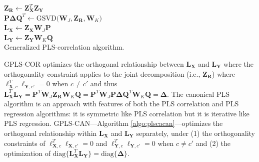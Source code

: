 \documentclass[12pt]{article}
\begin{document}
\begin{algorithm}
\DontPrintSemicolon
\SetAlgoLined
{}
\BlankLine
  $\mathbf{Z}_{\mathbf{R}} \leftarrow {\mathbf Z}_{{\mathbf X}}^{T}{\mathbf Z}_{{\mathbf Y}}$ \\
  $\mathbf{P}\boldsymbol{\Delta}{\mathbf Q}^{T} \leftarrow \mathrm{GSVD(} {\mathbf W}_{J}, \mathbf{Z}_{\mathbf{R}}, {\mathbf W}_{K} \mathrm{)}$ \\
  ${\mathbf L}_{\mathbf X} \leftarrow {\mathbf Z}_{\mathbf X}{\mathbf W}_{J}{\mathbf P}$ \\
  ${\mathbf L}_{\mathbf Y} \leftarrow {\mathbf Z}_{\mathbf Y}{\mathbf W}_{K}{\mathbf Q}$ \\
  
\caption{Generalized PLS-correlation algorithm.}
\label{algo:plsc}
\end{algorithm}

GPLS-COR optimizes the orthogonal relationship between
\({\mathbf L}_{\mathbf X}\) and \({\mathbf L}_{\mathbf Y}\) where the
orthogonality constraint applies to the joint decomposition (i.e.,
\(\mathbf{Z}_{\mathbf{R}}\)) where
\({\boldsymbol \ell}_{{\mathbf X},c}^{T}{\boldsymbol \ell}_{{\mathbf Y},c'} = 0\)
when \(c \neq c'\) and thus
\({\mathbf L}_{\mathbf X}^{T}{\mathbf L}_{\mathbf Y} = {\mathbf P}^{T}{\mathbf W}_{J}{\mathbf Z}_{{\mathbf R}}{\mathbf W}_{K}{\mathbf Q} = {\mathbf P}^{T}{\mathbf W}_{J}{\mathbf P}{\mathbf \Delta}{\mathbf Q}^{T}{\mathbf W}_{K}{\mathbf Q} = {\boldsymbol \Delta}\).
The canonical PLS algorithm is an approach with features of both the PLS
correlation and PLS regression algorithms: it is symmetric like PLS
correlation but it is iterative like PLS regression.
GPLS-CAN---Algorithm \ref{algo:plscacan}---optimizes the orthogonal
relationship within \({\mathbf L}_{\mathbf X}\) and
\({\mathbf L}_{\mathbf Y}\) separately, under (1) the orthogonality
constraints of
\({\boldsymbol \ell}_{{\mathbf X},c}^{T}{\boldsymbol \ell}_{{\mathbf X},c'} = 0\)
and
\({\boldsymbol \ell}_{{\mathbf Y},c}^{T}{\boldsymbol \ell}_{{\mathbf Y},c'} = 0\)
when \(c \neq c'\) and (2) the optimization of
\(\mathrm{diag\{}{\mathbf L}_{\mathbf X}^{T}{\mathbf L}_{\mathbf Y}\mathrm{\}} = \mathrm{diag\{}{\boldsymbol \Delta}\mathrm{\}}\).
\end{document}
